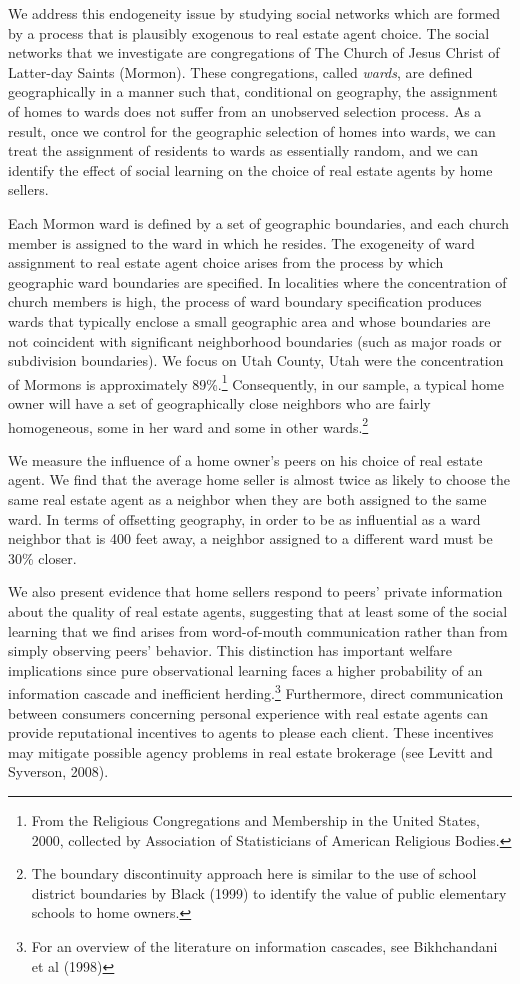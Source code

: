 \documentclass[12pt]{article}
\begin{document}
    We address this endogeneity issue by studying social networks which are formed by a process that is plausibly exogenous to real estate agent choice. The social networks that we investigate are congregations of The Church of Jesus Christ of Latter-day
    Saints (Mormon). These congregations, called \emph{wards}, are defined geographically in a manner such that, conditional on geography, the
    assignment of homes to wards does not suffer from an unobserved selection process. As a result, once we control for the geographic selection of
    homes into wards, we can treat the assignment of residents to wards as essentially random, and we can identify the effect of social learning on
    the choice of real estate agents by home sellers.

    Each Mormon ward is defined by a set of geographic boundaries, and each church member is assigned to the ward in which he resides. The
    exogeneity of ward assignment to real estate agent choice arises from the process by which geographic ward boundaries are specified. In
    localities where the concentration of church members is high, the process of ward boundary specification produces wards that typically enclose
    a small geographic area and whose boundaries are not coincident with significant neighborhood boundaries (such as major roads or subdivision
    boundaries).  We focus on Utah County, Utah were the concentration of Mormons is approximately 89\%.\footnote{From the Religious Congregations and
    Membership in the United States, 2000, collected by Association of Statisticians of American Religious Bodies.} Consequently, in our sample, a
    typical home owner will have a set of geographically close neighbors who are fairly homogeneous, some in her ward and some in other wards.\footnote{The boundary discontinuity approach here is similar to the use of school district boundaries by Black (1999) to identify the
    value of public elementary schools to home owners.}

    We measure the influence of a home owner's peers on his choice of real estate agent. We find that the average home seller is almost twice as
    likely to choose the same real estate agent as a neighbor when they are both assigned to the same ward. In terms of offsetting geography, in order to be as influential as a ward neighbor that is 400 feet away, a neighbor assigned to a different ward must be 30\% closer.

    We also present evidence that home sellers respond to peers' private information about the quality of real estate agents, suggesting that at least
    some of the social learning that we find arises from word-of-mouth communication rather than from simply observing peers' behavior. This distinction has important
    welfare implications since pure observational learning faces a higher probability of an information cascade and inefficient herding.\footnote{For
    an overview of the literature on information cascades, see Bikhchandani et al (1998)} Furthermore, direct communication between consumers
    concerning personal experience with real estate agents can provide reputational incentives to agents to please each client. These incentives may
    mitigate possible agency problems in real estate brokerage (see Levitt and Syverson, 2008).
\end{document}

